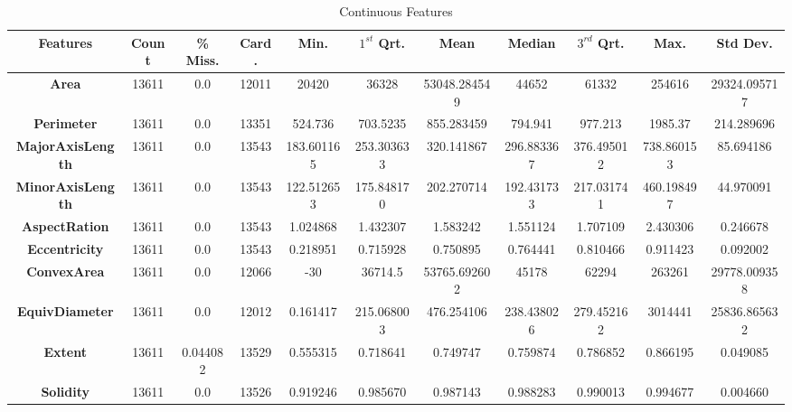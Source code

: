 \documentclass[10pt, conference]{IEEEtran}
\begin{document}
\printglossary[type=\acronymtype]

\clearpage

\begin{table}[h!]
    \caption{Continuous Features}
    \begin{center}
    \begin{tabular}{|c||c|c|c|c|c|c|c|c|c|c|}
        \hline
        \textbf{Features}&\textbf{Count}&\textbf{\% Miss.}&\textbf{Card.}&\textbf{Min.}&\textbf{$1^{st}$ Qrt.}&\textbf{Mean}&\textbf{Median}&\textbf{$3^{rd}$ Qrt.}&\textbf{Max}.&\textbf{Std Dev.}\\
        \hline
        \textbf{Area}               &13611  &0.0       &12011   &20420      &36328      &53048.284549 &44652      &61332      &254616     &29324.095717\\
        \textbf{Perimeter}          &13611  &0.0       &13351   &524.736    &703.5235   &855.283459   &794.941    &977.213    &1985.37    &214.289696\\
        \textbf{MajorAxisLength}    &13611  &0.0       &13543   &183.601165 &253.303633 &320.141867   &296.883367 &376.495012 &738.860153 &85.694186\\
        \textbf{MinorAxisLength}    &13611  &0.0       &13543   &122.512653 &175.848170	&202.270714   &192.431733 &217.031741 &460.198497 &44.970091\\
        \textbf{AspectRation}       &13611  &0.0       &13543   &1.024868   &1.432307   &1.583242     &1.551124   &1.707109	  &2.430306   &0.246678\\
        \textbf{Eccentricity}       &13611  &0.0       &13543   &0.218951   &0.715928   &0.750895     &0.764441	  &0.810466	  &0.911423   &0.092002\\
        \textbf{ConvexArea}         &13611  &0.0       &12066   &-30        &36714.5    &53765.692602 &45178      &62294      &263261     &29778.009358\\
        \textbf{EquivDiameter}      &13611  &0.0       &12012   &0.161417   &215.068003 &476.254106   &238.438026 &279.452162 &3014441    &25836.865632\\
        \textbf{Extent}             &13611  &0.044082  &13529   &0.555315   &0.718641   &0.749747     &0.759874   &0.786852	  &0.866195	  &0.049085\\
        \textbf{Solidity}           &13611  &0.0       &13526   &0.919246	&0.985670	&0.987143     &0.988283   &0.990013   &0.994677   &0.004660	\\

\end{tabular}
\end{center}
\end{table}
\end{document}
